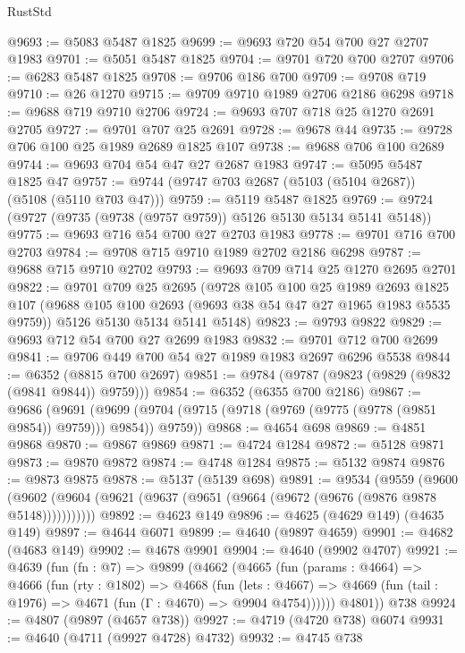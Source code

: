 \begin{lexlean}{RustStd}
\begin{coremodule}
@9693 := @5083 @5487 @1825
@9699 := @9693 @720 @54 @700 @27 @2707 @1983
@9701 := @5051 @5487 @1825
@9704 := @9701 @720 @700 @2707
@9706 := @6283 @5487 @1825
@9708 := @9706 @186 @700
@9709 := @9708 @719
@9710 := @26 @1270
@9715 := @9709 @9710 @1989 @2706 @2186 @6298
@9718 := @9688 @719 @9710 @2706
@9724 := @9693 @707 @718 @25 @1270 @2691 @2705
@9727 := @9701 @707 @25 @2691
@9728 := @9678 @44
@9735 := @9728 @706 @100 @25 @1989 @2689 @1825 @107
@9738 := @9688 @706 @100 @2689
@9744 := @9693 @704 @54 @47 @27 @2687 @1983
@9747 := @5095 @5487 @1825 @47
@9757 := @9744 (@9747 @703 @2687 (@5103 (@5104 @2687)) (@5108 (@5110 @703 @47)))
@9759 := @5119 @5487 @1825
@9769 := @9724 (@9727 (@9735 (@9738 (@9757 @9759)) @5126 @5130 @5134 @5141 @5148))
@9775 := @9693 @716 @54 @700 @27 @2703 @1983
@9778 := @9701 @716 @700 @2703
@9784 := @9708 @715 @9710 @1989 @2702 @2186 @6298
@9787 := @9688 @715 @9710 @2702
@9793 := @9693 @709 @714 @25 @1270 @2695 @2701
@9822 := @9701
    @709
    @25
    @2695
    (@9728
      @105
      @100
      @25
      @1989
      @2693
      @1825
      @107
      (@9688 @105 @100 @2693 (@9693 @38 @54 @47 @27 @1965 @1983 @5535 @9759))
      @5126
      @5130
      @5134
      @5141
      @5148)
@9823 := @9793 @9822
@9829 := @9693 @712 @54 @700 @27 @2699 @1983
@9832 := @9701 @712 @700 @2699
@9841 := @9706 @449 @700 @54 @27 @1989 @1983 @2697 @6296 @5538
@9844 := @6352 (@8815 @700 @2697)
@9851 := @9784 (@9787 (@9823 (@9829 (@9832 (@9841 @9844)) @9759)))
@9854 := @6352 (@6355 @700 @2186)
@9867 := @9686
    (@9691 (@9699 (@9704 (@9715 (@9718 (@9769 (@9775 (@9778 (@9851 @9854)) @9759))) @9854)) @9759))
@9868 := @4654 @698
@9869 := @4851 @9868
@9870 := @9867 @9869
@9871 := @4724 @1284
@9872 := @5128 @9871
@9873 := @9870 @9872
@9874 := @4748 @1284
@9875 := @5132 @9874
@9876 := @9873 @9875
@9878 := @5137 (@5139 @698)
@9891 := @9534
    (@9559
      (@9600 (@9602 (@9604 (@9621 (@9637 (@9651 (@9664 (@9672 (@9676 (@9876 @9878 @5148)))))))))))
@9892 := @4623 @149
@9896 := @4625 (@4629 @149) (@4635 @149)
@9897 := @4644 @6071
@9899 := @4640 (@9897 @4659)
@9901 := @4682 (@4683 @149)
@9902 := @4678 @9901
@9904 := @4640 (@9902 @4707)
@9921 := @4639
    (fun (fn : @7) =>
    @9899
      (@4662
        (@4665
          (fun (params : @4664) =>
          @4666
            (fun (rty : @1802) =>
            @4668
              (fun (lets : @4667) =>
              @4669 (fun (tail : @1976) => @4671 (fun (Γ : @4670) => @9904 @4754))))))
        @4801))
    @738
@9924 := @4807 (@9897 (@4657 @738))
@9927 := @4719 (@4720 @738) @6074
@9931 := @4640 (@4711 (@9927 @4728) @4732)
@9932 := @4745 @738

\end{coremodule}
\end{lexlean}
